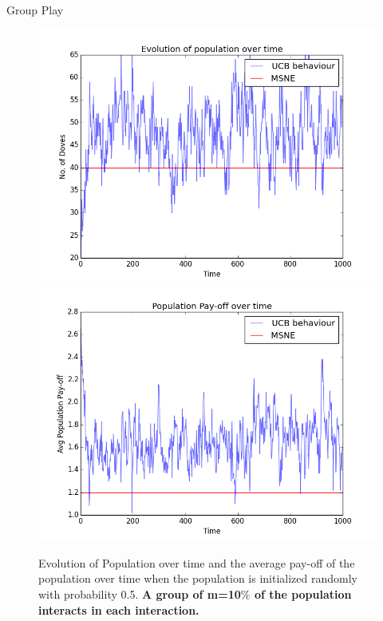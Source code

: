 \documentclass{IFES-beamer}
\begin{document}
        \begin{frame}{Group Play}
            \begin{figure}
                \centering
                \includegraphics[scale=0.25]{Images/UCB/Population/group_100_1000_epochs.png}
                \includegraphics[scale=0.25]{Images/UCB/Pay-off/pay-off_group_100_1000_epochs.png}
                \caption{Evolution of Population over time and the average pay-off of the population over time when the population is initialized randomly with probability 0.5. \textbf{A group of m=10$\%$ of the population interacts in each interaction.}}
                \label{fig:my_label}
            \end{figure}
        \end{frame}
        
\end{document}

